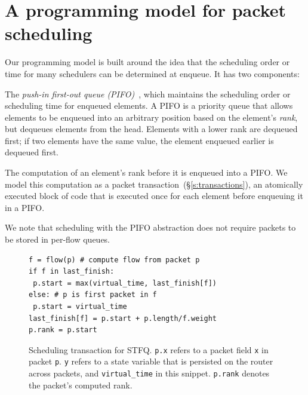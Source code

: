 \section{A programming model for packet scheduling}
\label{s:pifo}

Our programming model is built around the idea that the scheduling order or
time for many schedulers can be determined at enqueue. It has two components:
\begin{CompactEnumerate}
\item The {\em push-in first-out queue (PIFO)}~\cite{pifo}, which
  maintains the scheduling order or scheduling time for enqueued
  elements. A PIFO is a priority queue that allows elements to be
  enqueued into an arbitrary position based on the element's {\em
    rank}, but dequeues elements from the head. Elements with a lower
  rank are dequeued first; if two elements have the same value, the
  element enqueued earlier is dequeued first.

\item The computation of an element's rank before it is enqueued into
  a PIFO. We model this computation as a packet
    transaction~(\S\ref{s:transactions}), an atomically executed block
  of code that is executed once for each element before enqueuing it
  in a PIFO.
\end{CompactEnumerate}

We note that scheduling with the PIFO abstraction does not require packets to be
stored in per-flow queues.

\begin{figure}
\begin{lstlisting}[style=customc]
f = flow(p) # compute flow from packet p
if f in last_finish:
 p.start = max(virtual_time, last_finish[f])
else: # p is first packet in f
 p.start = virtual_time
last_finish[f] = p.start + p.length/f.weight
p.rank = p.start
\end{lstlisting}
\caption{Scheduling transaction for STFQ. {\tt p.x} refers to a packet
  field {\tt x} in packet {\tt p}.  {\tt y} refers to a state variable
  that is persisted on the router across packets, 
  and {\tt virtual\_time} in this snippet. {\tt p.rank} denotes the
  packet's computed rank.}
\label{fig:sched_trans}
\end{figure}

